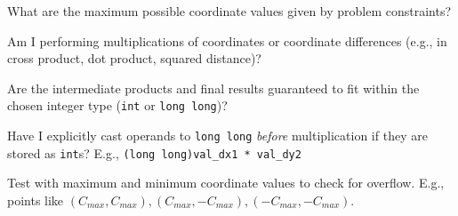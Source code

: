 \begin{debugchecklist}
\label{debug:A.3.2.int_overflow_checklist}
    \item What are the maximum possible coordinate values given by problem constraints?
    \item Am I performing multiplications of coordinates or coordinate differences (e.g., in cross product, dot product, squared distance)?
    \item Are the intermediate products and final results guaranteed to fit within the chosen integer type (\texttt{int} or \texttt{long long})?
    \item Have I explicitly cast operands to \texttt{long long} \emph{before} multiplication if they are stored as \texttt{int}s? E.g., \verb|(long long)val_dx1 * val_dy2|
    \item Test with maximum and minimum coordinate values to check for overflow. E.g., points like $(C_{max}, C_{max}), (C_{max}, -C_{max}), (-C_{max}, -C_{max})$.
\end{debugchecklist}